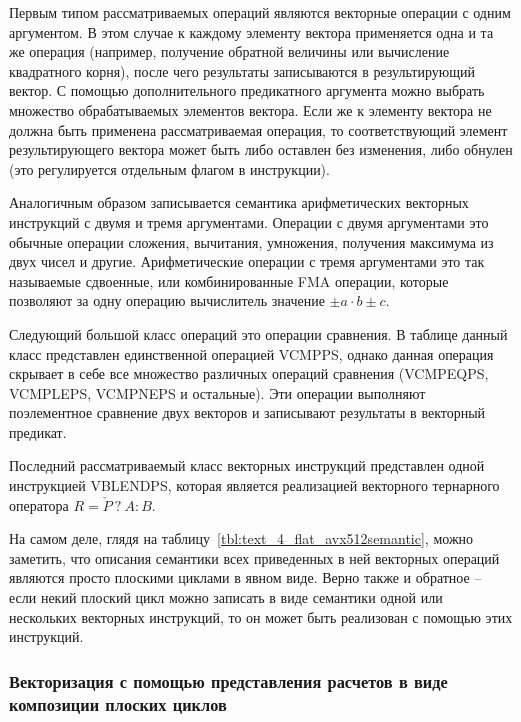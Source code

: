 Первым типом рассматриваемых операций являются векторные операции с одним аргументом.
В этом случае к каждому элементу вектора применяется одна и та же операция (например, получение обратной величины или вычисление квадратного корня), после чего результаты записываются в результирующий вектор.
С помощью дополнительного предикатного аргумента можно выбрать множество обрабатываемых элементов вектора.
Если же к элементу вектора не должна быть применена рассматриваемая операция, то соответствующий элемент результирующего вектора может быть либо оставлен без изменения, либо обнулен (это регулируется отдельным флагом в инструкции).

Аналогичным образом записывается семантика арифметических векторных инструкций с двумя и тремя аргументами.
Операции с двумя аргументами это обычные операции сложения, вычитания, умножения, получения максимума из двух чисел и другие.
Арифметические операции с тремя аргументами это так называемые сдвоенные, или комбинированные FMA операции, которые позволяют за одну операцию вычислитель значение $\pm a \cdot b \pm c$.

Следующий большой класс операций это операции сравнения.
В таблице данный класс представлен единственной операцией VCMPPS, однако данная операция скрывает в себе все множество различных операций сравнения (VCMPEQPS, VCMPLEPS, VCMPNEPS и остальные).
Эти операции выполняют поэлементное сравнение двух векторов и записывают результаты в векторный предикат.

Последний рассматриваемый класс векторных инструкций представлен одной инструкцией VBLENDPS, которая является реализацией векторного тернарного оператора $R = \check{P} \ ? \ A : B$.

На самом деле, глядя на таблицу~\ref{tbl:text_4_flat_avx512semantic}, можно заметить, что описания семантики всех приведенных в ней векторных операций являются просто плоскими циклами в явном виде.
Верно также и обратное -- если некий плоский цикл можно записать в виде семантики одной или нескольких векторных инструкций, то он может быть реализован с помощью этих инструкций.

\subsubsection{Векторизация с помощью представления расчетов в виде композиции плоских циклов}\label{sec:text_4_ibm}

